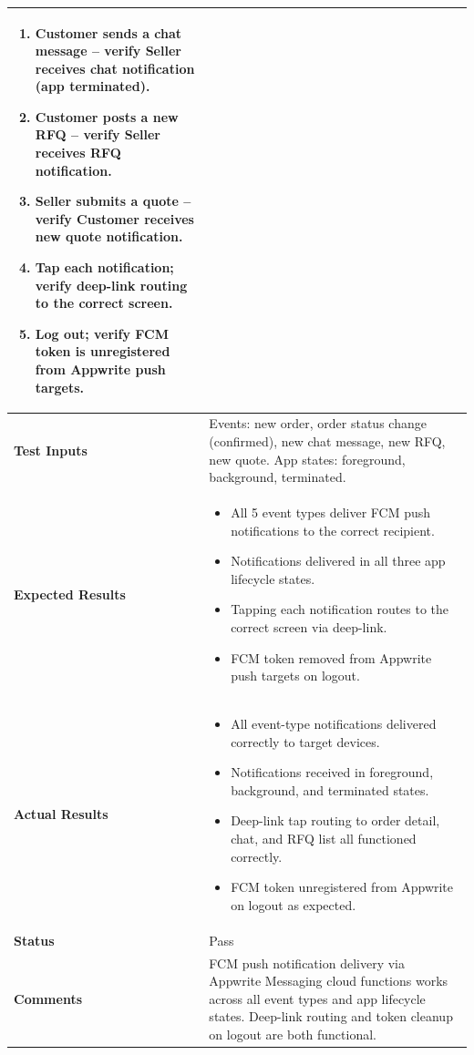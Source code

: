 \begin{table}[H]
\begin{tabular}{|p{3.2cm}|p{10.8cm}|}
\begin{enumerate}[leftmargin=*,noitemsep]
\item Customer sends a chat message -- verify Seller receives chat notification (app terminated).
\item Customer posts a new RFQ -- verify Seller receives RFQ notification.
\item Seller submits a quote -- verify Customer receives new quote notification.
\item Tap each notification; verify deep-link routing to the correct screen.
\item Log out; verify FCM token is unregistered from Appwrite push targets.
\end{enumerate} \\ \hline
\textbf{Test Inputs} & Events: new order, order status change (confirmed), new chat message, new RFQ, new quote. App states: foreground, background, terminated. \\ \hline
\textbf{Expected Results} &
\begin{itemize}[leftmargin=*,noitemsep]
\item All 5 event types deliver FCM push notifications to the correct recipient.
\item Notifications delivered in all three app lifecycle states.
\item Tapping each notification routes to the correct screen via deep-link.
\item FCM token removed from Appwrite push targets on logout.
\end{itemize} \\ \hline
\textbf{Actual Results} &
\begin{itemize}[leftmargin=*,noitemsep]
\item All event-type notifications delivered correctly to target devices.
\item Notifications received in foreground, background, and terminated states.
\item Deep-link tap routing to order detail, chat, and RFQ list all functioned correctly.
\item FCM token unregistered from Appwrite on logout as expected.
\end{itemize} \\ \hline
\textbf{Status} & Pass \\ \hline
\textbf{Comments} & FCM push notification delivery via Appwrite Messaging cloud functions works across all event types and app lifecycle states. Deep-link routing and token cleanup on logout are both functional. \\ \hline
\end{tabular}
\end{table}

